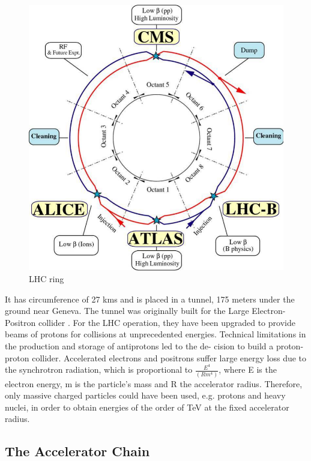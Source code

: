 \begin{figure}
  \includegraphics[width=\mediumfigwidth]{chap_CMSDetector_figures/lhc-schematic}
  \caption[LHC ring]%
  {LHC ring}
  \label{fig:LHCRing}
\end{figure}

It has circumference of 27 kms and is placed in a tunnel, 175 meters under the ground near Geneva.
The tunnel was originally built for the Large Electron-Positron collider \cite{LEP}. 
For the LHC operation, they have been upgraded to provide beams of protons for 
collisions at unprecedented energies. 
Technical limitations in the production and storage of antiprotons led to the de- 
cision to build a proton-proton collider. Accelerated electrons and positrons suffer 
large energy loss due to the synchrotron radiation, which is proportional to 
$\frac{E^4}{(Rm^4)}$, 
where E is the electron energy, m is the particle's mass and R the accelerator radius. 
Therefore, only massive charged particles could have been used, e.g. protons and 
heavy nuclei, in order to obtain energies of the order of TeV at the fixed accelerator 
radius. 

\subsection{The Accelerator Chain}

